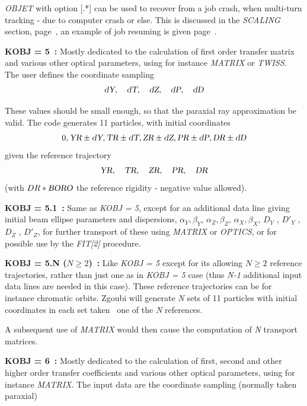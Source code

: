 \noindent \textsl{OBJET} with option [.*] can be used to recover from a job 
crash, when multi-turn tracking  - due to computer crash or else. This is discussed in the 
\textsl{SCALING} section, page~\pageref{SCALING}, an example of job resuming is given  page~\pageref{ExaOBJ3Recovery}. 

\bigskip


\noindent\textbf{KOBJ = 5~:} Mostly dedicated to the calculation of first order
transfer matrix and various other  optical parameters, 
 using for instance \textsl{MATRIX} or \textsl{TWISS}.  
The user defines the coordinate sampling 
\smallskip
$$ \textsl{dY},\quad \textsl{dT},\quad \textsl{dZ},\quad \textsl{dP},  \quad \textsl{dD} $$

\noindent These values should be small enough, so that the paraxial ray
approximation be valid. 
The code generates  11 particles,  with initial coordinates 
$$ 0, \textsl{YR} \pm \textsl{dY}, \textsl{TR} \pm \textsl{dT}, \textsl{ZR} \pm \textsl{dZ}, \textsl{PR} \pm \textsl{dP},  \textsl{DR} \pm \textsl{dD} $$
\noindent given  the reference trajectory  
$$\textsl{YR}, \quad \textsl{TR}, \quad \textsl{ZR}, \quad \textsl{PR},  \quad \textsl{DR} $$
(with $ DR\ast \textsl{BORO}$  the reference rigidity - negative value allowed). 


\bigskip

\noindent\textbf{KOBJ = 5.1~:} Same as \textsl{KOBJ = 5}, except for an additional data line giving 
initial beam ellipse parameters and  dispersions,  
$\alpha_Y, \beta_Y$, $\alpha_Z, \beta_Z$, $\alpha_X, \beta_X$, $D_Y$ , $D'_Y$ , $D_Z$ , $D'_Z$,  
 for further transport of these using \textsl{MATRIX} or \textsl{OPTICS}, 
or for  possible use by the \textsl{FIT[2]} procedure. 

\bigskip

\noindent \textbf{KOBJ = 5.N ($N \geq 2$)~:} Like \textsl{KOBJ = 5} except for its 
allowing $N \geq 2$ reference trajectories, rather than just one as in \textsl{KOBJ = 5}  case
(thus \textsl{N-1} additional input data lines are  needed in this case).  
These reference trajectories can be for instance chromatic orbits. 
Zgoubi will generate  \textsl{N} sets of 11 particles with initial  coordinates in each set taken \wrt\ one 
of the  \textsl{N} references. 


\medskip 

\noindent A subsequent use of \textsl{MATRIX}  would then cause the computation of \textsl{N} transport matrices. 


\bigskip

\noindent\textbf{KOBJ = 6~:}  Mostly dedicated to the calculation of first, second
and other higher order transfer coefficients and various other  optical parameters, 
using for instance \textsl{MATRIX}. 
The input data are the coordinate sampling (normally taken paraxial)  

